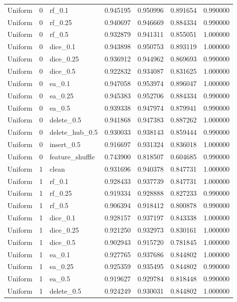 \documentclass[UTF8,a4paper,11pt,fontset=fandol]{ctexart}
\begin{document}
{\begin{longtable}{lrlrrrr}
Uniform & 0 & rf\_0.1 & 0.945195 & 0.950996 & 0.891654 & 0.990000 \\
Uniform & 0 & rf\_0.25 & 0.940697 & 0.946669 & 0.884334 & 0.990000 \\
Uniform & 0 & rf\_0.5 & 0.932879 & 0.941311 & 0.855051 & 1.000000 \\
Uniform & 0 & dice\_0.1 & 0.943898 & 0.950753 & 0.893119 & 1.000000 \\
Uniform & 0 & dice\_0.25 & 0.936912 & 0.944962 & 0.869693 & 0.990000 \\
Uniform & 0 & dice\_0.5 & 0.922832 & 0.934087 & 0.831625 & 1.000000 \\
Uniform & 0 & ea\_0.1 & 0.947058 & 0.953974 & 0.896047 & 1.000000 \\
Uniform & 0 & ea\_0.25 & 0.945383 & 0.952706 & 0.884334 & 0.990000 \\
Uniform & 0 & ea\_0.5 & 0.939338 & 0.947974 & 0.879941 & 0.990000 \\
Uniform & 0 & delete\_0.5 & 0.941868 & 0.947383 & 0.887262 & 1.000000 \\
Uniform & 0 & delete\_hub\_0.5 & 0.930033 & 0.938143 & 0.859444 & 0.990000 \\
Uniform & 0 & insert\_0.5 & 0.916697 & 0.931324 & 0.836018 & 1.000000 \\
Uniform & 0 & feature\_shuffle & 0.743900 & 0.818507 & 0.604685 & 0.990000 \\
Uniform & 1 & clean & 0.931696 & 0.940378 & 0.847731 & 1.000000 \\
Uniform & 1 & rf\_0.1 & 0.928433 & 0.937739 & 0.847731 & 1.000000 \\
Uniform & 1 & rf\_0.25 & 0.919334 & 0.928888 & 0.827233 & 0.990000 \\
Uniform & 1 & rf\_0.5 & 0.906394 & 0.918412 & 0.800878 & 0.990000 \\
Uniform & 1 & dice\_0.1 & 0.928157 & 0.937197 & 0.843338 & 1.000000 \\
Uniform & 1 & dice\_0.25 & 0.921250 & 0.932973 & 0.830161 & 1.000000 \\
Uniform & 1 & dice\_0.5 & 0.902943 & 0.915720 & 0.781845 & 1.000000 \\
Uniform & 1 & ea\_0.1 & 0.927765 & 0.937686 & 0.844802 & 1.000000 \\
Uniform & 1 & ea\_0.25 & 0.925359 & 0.935495 & 0.844802 & 0.990000 \\
Uniform & 1 & ea\_0.5 & 0.919627 & 0.929784 & 0.818448 & 0.990000 \\
Uniform & 1 & delete\_0.5 & 0.924249 & 0.930031 & 0.844802 & 1.000000 \\

\end{longtable}}
\end{document}

